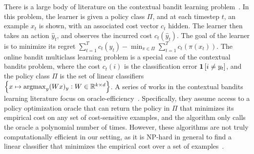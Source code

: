 

There is a large body of literature on the contextual bandit learning
problem~\citep{Auer-2003, Langford-Zhang-2008}. In this problem, the learner is
given a policy class $\Pi$, and at each timestep $t$, an example $x_t$ is shown,
with an associated cost vector $c_t$ hidden. The learner then takes an action
$\widehat{y}_t$, and observes the incurred cost $c_t(\widehat{y}_t)$. The goal
of the learner is to minimize its regret $\sum_{t=1}^T c_t(\widehat{y}_t) -
\min_{\pi \in \Pi} \sum_{t=1}^T c_t(\pi(x_t))$. The online bandit multiclass
learning problem is a special case of the contextual bandits problem, where the
cost $c_t(i)$ is the classification error $\mathbf{1}\left[i \neq y_t \right]$, and the
policy class $\Pi$ is the set of linear classifiers $\cbr{x \mapsto \argmax_y
(Wx)_y: W \in \R^{k \times d}}$. A series of works in the contextual bandits
learning literature focus on
oracle-efficiency~\citep{Dudik-Hsu-Kale-Karampatziakis-Langford-Reyzin-Zhang-2011,
Agarwal-Hsu-Kale-Langford-Li-Schapire-2014, Rakhlin-Sridharan-2016,
Syrgkanis-Krishnamurthy-Schapire-2016,
Syrgkanis-Luo-Krishnamurthy-Schapire-2016}. Specifically, they assume access to
a policy optimization oracle that can return the policy in $\Pi$ that minimizes
its empirical cost on any set of cost-sensitive examples, and the algorithm only
calls the oracle a polynomial number of times. However, these algorithms are not
truly computationally efficient in our setting, as it is NP-hard in general to
find a linear classifier that minimizes the empirical cost over a set of
examples~\citep{Arora-Babai-Stern-Sweedyk-1997}.

